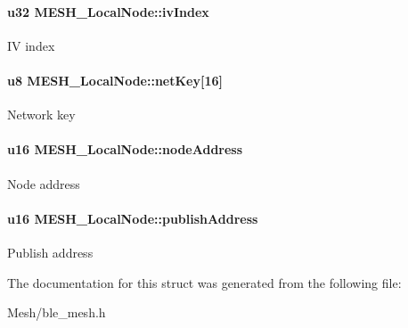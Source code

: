 \paragraph[{\texorpdfstring{iv\+Index}{ivIndex}}]{\setlength{\rightskip}{0pt plus 5cm}u32 M\+E\+S\+H\+\_\+\+Local\+Node\+::iv\+Index}\hypertarget{struct_m_e_s_h___local_node_a4250d93a5fc69be1340181fdb220b438}{}\label{struct_m_e_s_h___local_node_a4250d93a5fc69be1340181fdb220b438}
IV index 
\paragraph[{\texorpdfstring{net\+Key}{netKey}}]{\setlength{\rightskip}{0pt plus 5cm}u8 M\+E\+S\+H\+\_\+\+Local\+Node\+::net\+Key\mbox{[}16\mbox{]}}\hypertarget{struct_m_e_s_h___local_node_a5236a0d008e2cfcc63a9d4756d9b35cf}{}\label{struct_m_e_s_h___local_node_a5236a0d008e2cfcc63a9d4756d9b35cf}
Network key 
\paragraph[{\texorpdfstring{node\+Address}{nodeAddress}}]{\setlength{\rightskip}{0pt plus 5cm}u16 M\+E\+S\+H\+\_\+\+Local\+Node\+::node\+Address}\hypertarget{struct_m_e_s_h___local_node_adbc7151638557d67a10c44e6a87ba7e7}{}\label{struct_m_e_s_h___local_node_adbc7151638557d67a10c44e6a87ba7e7}
Node address 
\paragraph[{\texorpdfstring{publish\+Address}{publishAddress}}]{\setlength{\rightskip}{0pt plus 5cm}u16 M\+E\+S\+H\+\_\+\+Local\+Node\+::publish\+Address}\hypertarget{struct_m_e_s_h___local_node_a0c2b076ef25341d7f473cc73b0b5f792}{}\label{struct_m_e_s_h___local_node_a0c2b076ef25341d7f473cc73b0b5f792}
Publish address 

The documentation for this struct was generated from the following file\+:\begin{DoxyCompactItemize}
\item 
Mesh/ble\+\_\+mesh.\+h\end{DoxyCompactItemize}
